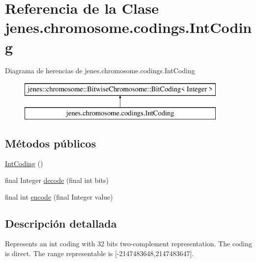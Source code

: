 \hypertarget{classjenes_1_1chromosome_1_1codings_1_1_int_coding}{\section{Referencia de la Clase jenes.\-chromosome.\-codings.\-Int\-Coding}
\label{classjenes_1_1chromosome_1_1codings_1_1_int_coding}
}
Diagrama de herencias de jenes.\-chromosome.\-codings.\-Int\-Coding\begin{figure}[H]
\begin{center}
\leavevmode
\includegraphics[height=2.000000cm]{classjenes_1_1chromosome_1_1codings_1_1_int_coding}
\end{center}
\end{figure}
\subsection*{Métodos públicos}
\begin{DoxyCompactItemize}
\item 
\hyperlink{classjenes_1_1chromosome_1_1codings_1_1_int_coding_af99166e5452fdf789dc235ce473872c9}{Int\-Coding} ()
\item 
final Integer \hyperlink{classjenes_1_1chromosome_1_1codings_1_1_int_coding_a2097eb05c6efc1572e07d23709f2f4f7}{decode} (final int bits)
\item 
final int \hyperlink{classjenes_1_1chromosome_1_1codings_1_1_int_coding_ab320730ca00ec9be8d2e7e52f3bdb8eb}{encode} (final Integer value)
\end{DoxyCompactItemize}


\subsection{Descripción detallada}
Represents an int coding with 32 bits two-\/complement representation. The coding is direct. The range representable is \mbox{[}-\/2147483648,2147483647\mbox{]}.


